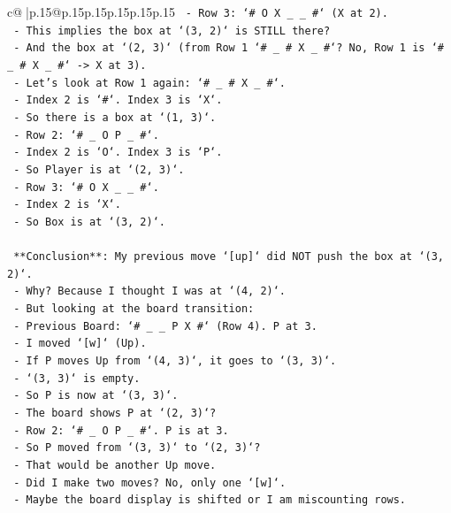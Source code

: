 \documentclass{article}
\begin{document}
{\begin{supertabular}{c@{$\;$}|p{.15\linewidth}@{}p{.15\linewidth}p{.15\linewidth}p{.15\linewidth}p{.15\linewidth}p{.15\linewidth}}
{{{\texttt{        {-} Row 3: `\# O X \_ \_ \#` (X at 2).} \\
\texttt{      {-} This implies the box at `(3, 2)` is STILL there?} \\
\texttt{      {-} And the box at `(2, 3)` (from Row 1 `\# \_ \# X \_ \#`? No, Row 1 is `\# \_ \# X \_ \#` {-}> X at 3).} \\
\texttt{      {-} Let's look at Row 1 again: `\# \_ \# X \_ \#`.} \\
\texttt{        {-} Index 2 is `\#`. Index 3 is `X`.} \\
\texttt{        {-} So there is a box at `(1, 3)`.} \\
\texttt{      {-} Row 2: `\# \_ O P \_ \#`.} \\
\texttt{        {-} Index 2 is `O`. Index 3 is `P`.} \\
\texttt{        {-} So Player is at `(2, 3)`.} \\
\texttt{      {-} Row 3: `\# O X \_ \_ \#`.} \\
\texttt{        {-} Index 2 is `X`.} \\
\texttt{        {-} So Box is at `(3, 2)`.} \\
\\ 
\texttt{      **Conclusion**: My previous move `{[}up{]}` did NOT push the box at `(3, 2)`.} \\
\texttt{      {-} Why? Because I thought I was at `(4, 2)`.} \\
\texttt{      {-} But looking at the board transition:} \\
\texttt{        {-} Previous Board: `\# \_ \_ P X \#` (Row 4). P at 3.} \\
\texttt{        {-} I moved `{[}w{]}` (Up).} \\
\texttt{        {-} If P moves Up from `(4, 3)`, it goes to `(3, 3)`.} \\
\texttt{        {-} `(3, 3)` is empty.} \\
\texttt{        {-} So P is now at `(3, 3)`.} \\
\texttt{        {-} The board shows P at `(2, 3)`?} \\
\texttt{        {-} Row 2: `\# \_ O P \_ \#`. P is at 3.} \\
\texttt{        {-} So P moved from `(3, 3)` to `(2, 3)`?} \\
\texttt{        {-} That would be another Up move.} \\
\texttt{        {-} Did I make two moves? No, only one `{[}w{]}`.} \\
\texttt{        {-} Maybe the board display is shifted or I am miscounting rows.} \\
}}}
\end{supertabular}}
\end{document}

